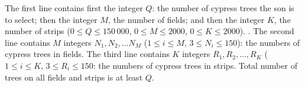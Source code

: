 The first line contains first the integer $Q$: the number of cypress trees the son is to select; then the integer $M$, the number of fields; and then the integer $K$, the number of strips ($0 \le Q \le 150\,000$, $0 \le M \le 2000$, $0 \le K \le 2000$).
. The second line contains $M$ integers $N_1, N_2, \ldots N_M$ ($1 \le i \le M$, $3 \le N_i \le 150$): the numbers of cypress trees in fields. The third line contains $K$ integers $R_1, R_2, \ldots, R_K$ ($1 \le i \le K$, $3 \le R_i \le 150$: the numbers of cypress trees in strips. Total number of trees on all fields and strips is at least $Q$. 

